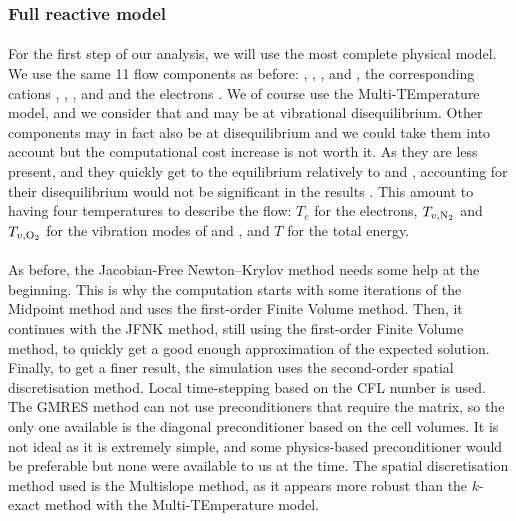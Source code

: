       \subsubsection{Full reactive model}

        \paragraph{}
        For the first step of our analysis, we will use the most complete physical model.
        We use the same 11 flow components as before: , , ,  and , the corresponding cations , , ,  and  and the electrons .
        We of course use the Multi-TEmperature model, and we consider that  and  may be at vibrational disequilibrium.
        Other components may in fact also be at disequilibrium and we could take them into account but the computational cost increase is not worth it.
        As they are less present, and they quickly get to the equilibrium relatively to  and , accounting for their disequilibrium would not be significant in the results \cite{Park2006}.
        This amount to having four temperatures to describe the flow: $T_e$ for the electrons, $T_{v, \ce{N_2}}$ and $T_{v, \ce{O_2}}$ for the vibration modes of  and , and $T$ for the total energy.

        \paragraph{}
        As before, the Jacobian-Free Newton--Krylov method needs some help at the beginning.
        This is why the computation starts with some iterations of the Midpoint method and uses the first-order Finite Volume method.
        Then, it continues with the JFNK method, still using the first-order Finite Volume method, to quickly get a good enough approximation of the expected solution.
        Finally, to get a finer result, the simulation uses the second-order spatial discretisation method.
        Local time-stepping based on the CFL number is used.
        The GMRES method can not use preconditioners that require the matrix, so the only one available is the diagonal preconditioner based on the cell volumes.
        It is not ideal as it is extremely simple, and some physics-based preconditioner would be preferable \cite{KnollKeyes2004} but none were available to us at the time.
        The spatial discretisation method used is the Multislope method, as it appears more robust than the $k$-exact method with the Multi-TEmperature model.

